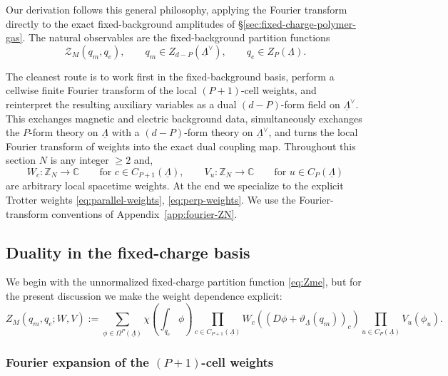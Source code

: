 \documentclass[dvipsnames,a4paper]{article}
\numberwithin{equation}{section}
\theoremstyle{definition}
\theoremstyle{remark}
\begin{document}
Our derivation follows this general philosophy, applying the
Fourier transform directly to the exact fixed-background amplitudes of
\S\ref{sec:fixed-charge-polymer-gas}. The natural observables are the fixed-background partition functions
\begin{equation}
\mathcal Z_M(q_m,q_e),
\qquad
q_m\in Z_{d-P}(\underline\Lambda^\vee),
\qquad
q_e\in Z_P(\underline\Lambda).
\end{equation}

The cleanest route is to work first in the fixed-background basis, perform a cellwise
finite Fourier transform of the local \((P+1)\)-cell weights, and reinterpret the resulting
auxiliary variables as a dual \((d-P)\)-form field on \(\underline\Lambda^\vee\). This
exchanges magnetic and electric background data, simultaneously exchanges the \(P\)-form
theory on \(\underline\Lambda\) with a \((d-P)\)-form theory on
\(\underline\Lambda^\vee\), and turns the local Fourier transform of weights into the exact
dual coupling map. Throughout this section $N$ is any integer $\ge 2$ and,
\begin{equation}
W_c:\mathbb Z_N\to\mathbb C
\qquad \text{for } c\in C_{P+1}(\underline\Lambda),
\qquad
V_u:\mathbb Z_N\to\mathbb C
\qquad \text{for } u\in C_P(\underline\Lambda)
\end{equation}
are arbitrary local spacetime weights. At the end we specialize to the explicit Trotter
weights  \eqref{eq:parallel-weights}, \eqref{eq:perp-weights}. We use the Fourier-transform conventions of Appendix~\ref{app:fourier-ZN}.




\subsection{Duality in the fixed-charge basis}
\label{sec:KW-fixed-charge}

We begin with the unnormalized fixed-charge partition function
\eqref{eq:Zme}, but for the present discussion we make the weight
dependence explicit:
\begin{equation}
	Z_M(q_m,q_e;W,V)
	:=
	\sum_{\phi\in \Omega^P(\underline\Lambda)}
	\chi \left(\int_{q_e}\phi\right)
	\prod_{c\in C_{P+1}(\underline\Lambda)}
	W_c \left((D\phi+\vartheta_{\underline\Lambda}(q_m))_c\right)
	\prod_{u\in C_P(\underline\Lambda)}
	V_u(\phi_u).
	\label{eq:KW-raw-fixed-charge}
\end{equation}


\subsubsection{Fourier expansion of the \((P+1)\)-cell weights}
\end{document}
